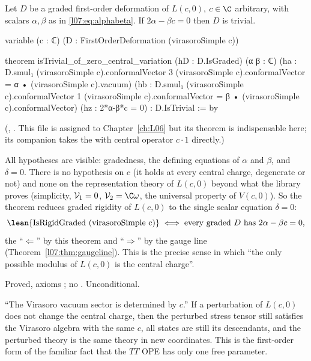 \begin{theorem}\label{l07:thm:zerodelta}
Let $D$ be a graded first-order deformation of $L(c,0)$, $c\in\C$ arbitrary, with scalars $\alpha,\beta$
as in \eqref{l07:eq:alphabeta}. If $2\alpha-\beta c = 0$ then $D$ is trivial.
\end{theorem}
\begin{leancode}
variable (c : ℂ) (D : FirstOrderDeformation (virasoroSimple c))

theorem isTrivial_of_zero_central_variation (hD : D.IsGraded) (α β : ℂ)
    (ha : D.smul₁ (virasoroSimple c).conformalVector 3
      (virasoroSimple c).conformalVector = α • (virasoroSimple c).vacuum)
    (hb : D.smul₁ (virasoroSimple c).conformalVector 1
      (virasoroSimple c).conformalVector = β • (virasoroSimple c).conformalVector)
    (hz : 2*α-β*c = 0) : D.IsTrivial := by
\end{leancode}
(,
. This file is assigned to
Chapter~\ref{ch:L06} but its theorem is indispensable here; its companion 
takes the  with central operator $c\cdot1$ directly.)

\begin{dictionary}
All hypotheses are visible: gradedness, the defining equations of $\alpha$ and $\beta$, and $\delta = 0$.
There is no hypothesis on $c$ (it holds at every central charge, degenerate or not) and none on the
representation theory of $L(c,0)$ beyond what the library proves (simplicity, $\mathcal{V}_1 = 0$, $\lsevenV_2 = \C\omega$,
the universal property of $V(c,0)$). So the theorem reduces graded rigidity of $L(c,0)$ to the single
scalar equation $\delta = 0$:
\begin{equation*}
 \text{\lean{IsRigidGraded (virasoroSimple c)}}\iff\text{every graded $D$ has }2\alpha-\beta c = 0,
\end{equation*}
the ``$\Leftarrow$'' by this theorem and ``$\Rightarrow$'' by the gauge line
(Theorem~\ref{l07:thm:gaugeline}). This is the precise sense in which ``the only possible modulus of
$L(c,0)$ is the central charge''.
\end{dictionary}

\begin{status}
Proved, axioms ; no . Unconditional.
\end{status}
\begin{physics}
``The Virasoro vacuum sector is determined by $c$.'' If a perturbation of $L(c,0)$ does not change the central
charge, then the perturbed stress tensor still satisfies the Virasoro algebra with the same $c$, all states are
still its descendants, and the perturbed theory is the same theory in new coordinates. This is the
first-order form of the familiar fact that the $TT$ OPE has only one free parameter.
\end{physics}


